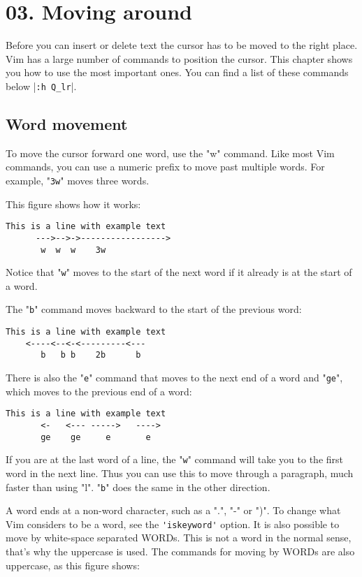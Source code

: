 \section{03. Moving around}
Before you can insert or delete text the cursor has to be moved to the right
place.  Vim has a large number of commands to position the cursor.  This
chapter shows you how to use the most important ones.  You can find a list of
these commands below |\verb!:h Q_lr!|.
\subsection{Word movement}

To move the cursor forward one word, use the "w" command.
Like most Vim commands, you can use a numeric prefix to move past multiple words.
For example, "\verb!3w!" moves three words.

This figure shows how it works:

		\begin{Verbatim}[samepage=true]
    This is a line with example text 
      --->-->->----------------->
       w  w  w    3w
		\end{Verbatim}

Notice that "\verb!w!" moves to the start of the next word if it already is at the start of a word.

The "\verb!b!" command moves backward to the start of the previous word:

		\begin{Verbatim}[samepage=true]
    This is a line with example text 
    <----<--<-<---------<---
       b   b b    2b      b
		\end{Verbatim}

There is also the "\verb!e!" command that moves to the next end of a word and "\verb!ge!", which moves to the previous end of a word:

		\begin{Verbatim}[samepage=true]
    This is a line with example text 
       <-   <--- ----->   ---->
       ge    ge     e       e
		\end{Verbatim}

If you are at the last word of a line, the "\verb!w!" command will take you to the first word in the next line.
Thus you can use this to move through a paragraph, much faster than using "l".
"\verb!b!" does the same in the other direction.

A word ends at a non-word character, such as a ".", "-" or ")".
To change what Vim considers to be a word, see the \verb!'iskeyword'! option.
It is also possible to move by white-space separated WORDs.
This is not a word in the normal sense, that's why the uppercase is used.
The commands for moving by WORDs are also uppercase, as this figure shows:

